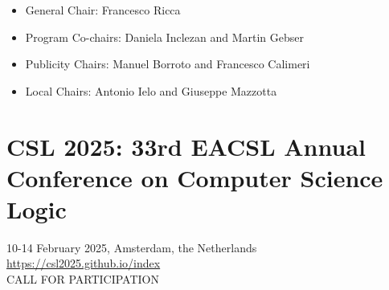 \documentclass[prodmode,acmtecs]{acmsmall} %
\begin{document}
\begin{itemize}
\begin{itemize}\item  General Chair: Francesco Ricca
\item  Program Co-chairs: Daniela Inclezan and Martin Gebser
\item  Publicity Chairs: Manuel Borroto and Francesco Calimeri
\item  Local Chairs: Antonio Ielo and Giuseppe Mazzotta
\end{itemize} 
\end{itemize}\section{CSL 2025: 33rd EACSL Annual Conference on Computer Science Logic }\label{CSL2025}  10-14 February 2025, Amsterdam, the Netherlands\\ 
  \href{https://csl2025.github.io/index}{https://csl2025.github.io/index}\\ 
CALL FOR PARTICIPATION  
\end{document}
